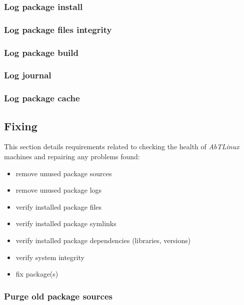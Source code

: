%
%
\subsubsection{Log package install}


\subsubsection{Log package files integrity}


\subsubsection{Log package build}


\subsubsection{Log journal}


\subsubsection{Log package cache}




\newpage
\subsection{Fixing}
This section details requirements related to checking the health of
\emph{AbTLinux} machines and repairing any problems found:

\begin{itemize}
  \item remove unused package sources
  \item remove unused package logs
  \item verify installed package files
  \item verify installed package symlinks
  \item verify installed package dependencies (libraries, versions)
  \item verify system integrity 
  \item fix package(s)
\end{itemize}

%
%
\subsubsection{Purge old package sources}


